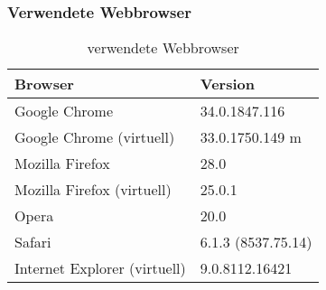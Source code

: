 	\subsubsection{Verwendete \Gls{Webbrowser}}	
	\begin{table}[H]
	 \vspace{-20pt}
 		\centering
			\begin{tabular}{| p{8cm} | p{4cm}  |}
			\hline
				Browser		 	&	Version	\\
			\hline

			\hline
				Google Chrome			&	34.0.1847.116\\
				Google Chrome (virtuell)		&	33.0.1750.149 m\\
				Mozilla Firefox				&	28.0\\
				Mozilla Firefox (virtuell)		&	25.0.1\\
				Opera					&	20.0\\
				Safari					&	6.1.3 (8537.75.14)\\
				Internet Explorer (virtuell)		&	9.0.8112.16421\\
				\hline
				\end{tabular}
			\caption{verwendete \Gls{Webbrowser}}
	\end{table}


	
	
	
